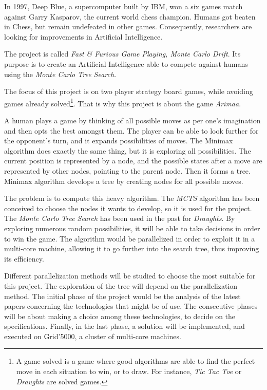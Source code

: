 
In 1997, Deep Blue, a supercomputer built by IBM, won a six games match against Garry Kasparov, the current world chess champion. Humans got beaten in Chess, but remain undefeated in other games. Consequently, researchers are looking for improvements in Artificial Intelligence.
\newline

The project is called \emph{Fast \& Furious Game Playing, Monte Carlo Drift}. Its purpose is to create an Artificial Intelligence able to compete against humans using the \emph{Monte Carlo Tree Search}.
\newline

The focus of this project is on two player strategy board games, while avoiding games already solved\footnote{A game solved is a game where good algorithms are able to find the perfect move in each situation to win, or to draw. For instance, \textit{Tic Tac Toe} or \textit{Draughts} are solved games.}. That is why this project is about the game \emph{Arimaa}.
\newline

A human plays a game by thinking of all possible moves as per one's imagination and then opts the best amongst them. The player can be able to look further for the opponent's turn, and it expands possibilities of moves. The Minimax algorithm does exactly the same thing, but it is exploring all possibilities. The current position is represented by a node, and the possible states after a move are represented by other nodes, pointing to the parent node. Then it forms a tree.
Minimax algorithm develops a tree by creating nodes for all possible moves.
\newline

The problem is to compute this heavy algorithm. The \emph{MCTS} algorithm has been conceived to choose  the nodes it wants to develop, so it is used for the project.
The \emph{Monte Carlo Tree Search} has been used in the past for \textit{Draughts}. By exploring numerous random possibilities, it will be able to take decisions in order to win the game.
The algorithm would be parallelized in order to exploit it in a multi-core machine, allowing it to go further into the search tree, thus improving its efficiency.
\newline

Different parallelization methods will be studied to choose the most suitable for this project.
The exploration of the tree will depend on the parallelization method.
The initial phase of the project would be the analysis of the latest papers concerning the technologies that might be of use.
The consecutive phases will be about making a choice among these technologies, to decide on the specifications.
Finally, in the last phase, a solution will be implemented, and executed on Grid'5000, a cluster of multi-core machines.
\newline

